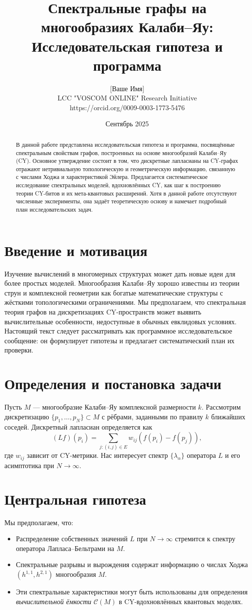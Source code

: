 \documentclass[12pt,a4paper]{article}
\title{Спектральные графы на многообразиях Калаби--Яу: \\
Исследовательская гипотеза и программа}
\author{[Ваше Имя] \\ LCC "VOSCOM ONLINE" Research Initiative \\ https://orcid.org/0009-0003-1773-5476}
\date{Сентябрь 2025}
\begin{document}
\maketitle

\begin{abstract}
В данной работе представлена исследовательская гипотеза и программа, 
посвящённые спектральным свойствам графов, построенных на основе 
многообразий Калаби--Яу (CY). 
Основное утверждение состоит в том, что дискретные лапласианы на CY-графах 
отражают нетривиальную топологическую и геометрическую информацию, 
связанную с числами Ходжа и характеристикой Эйлера. 
Предлагается систематическое исследование спектральных моделей, вдохновлённых CY, 
как шаг к построению теории CY-битов и их мета-квантовых расширений. 
Хотя в данной работе отсутствуют численные эксперименты, 
она задаёт теоретическую основу и намечает подробный план исследовательских задач.
\end{abstract}

\section{Введение и мотивация}
Изучение вычислений в многомерных структурах 
может дать новые идеи для более простых моделей. 
Многообразия Калаби--Яу хорошо известны из теории струн и комплексной геометрии 
как богатые математические структуры с жёсткими топологическими ограничениями. 
Мы предполагаем, что спектральная теория графов на дискретизациях CY-пространств 
может выявить вычислительные особенности, недоступные в обычных евклидовых условиях.  
Настоящий текст следует рассматривать как программное исследовательское сообщение: 
он формулирует гипотезы и предлагает систематический план их проверки.

\section{Определения и постановка задачи}
Пусть $M$ — многообразие Калаби--Яу комплексной размерности $k$.  
Рассмотрим дискретизацию $\{p_1,\dots,p_N\}\subset M$ 
с рёбрами, заданными по правилу $k$ ближайших соседей.  
Дискретный лапласиан определяется как
\[
(Lf)(p_i) = \sum_{j:(i,j)\in E} w_{ij}(f(p_i)-f(p_j)),
\]
где $w_{ij}$ зависит от CY-метрики.
Нас интересует спектр $\{\lambda_\alpha\}$ оператора $L$ 
и его асимптотика при $N \to \infty$.

\section{Центральная гипотеза}
Мы предполагаем, что:
\begin{itemize}
\item Распределение собственных значений $L$ при $N \to \infty$ 
стремится к спектру оператора Лапласа–Бельтрами на $M$.  
\item Спектральные разрывы и вырождения содержат информацию о числах Ходжа 
$(h^{1,1}, h^{2,1})$ многообразия $M$.  
\item Эти спектральные характеристики могут быть использованы для определения 
\emph{вычислительной ёмкости} $\mathcal{C}(M)$ 
в CY-вдохновлённых квантовых моделях.  
\end{itemize}
\end{document}
